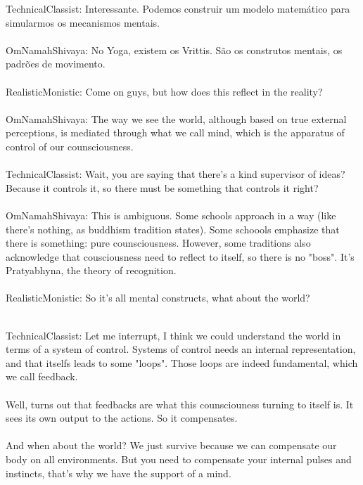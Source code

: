 \documentclass[11pt]{article}
\begin{document}
TechnicalClassist: Interessante. Podemos construir um modelo matemático para simularmos os mecanismos mentais.\\\\

OmNamahShivaya: No Yoga, existem os Vrittis. São os construtos mentais, os padrões de movimento.\\\\

RealisticMonistic: Come on guys, but how does this reflect in the reality? \\\\ 

OmNamahShivaya: The way we see the world, although based on true external perceptions, is mediated through what we call mind, which is the apparatus of control of our counsciousness.\\\\

TechnicalClassist: Wait, you are saying that there's a kind supervisor of ideas? Because it controls it, so there must be something that controls it right?\\\\

OmNamahShivaya: This is ambiguous. Some schools approach in a way (like there's nothing, as buddhism tradition states). Some schoools emphasize that there is something: pure counsciousness. However, some traditions also acknowledge that cousciousness need to reflect to itself, so there is no "boss". It's Pratyabhyna, the theory of recognition. \\\\

RealisticMonistic: So it's all mental constructs, what about the world?\\\

TechnicalClassist: Let me interrupt, I think we could understand the world in terms of a system of control. Systems of control needs an internal representation, and that itselfs leads to some "loops". Those loops are indeed fundamental, which we call feedback.\\\\ 

Well, turns out that feedbacks are what this counsciouness turning to itself is. It sees its own output to the actions. So it compensates.\\\\

And when about the world? We just survive because we can compensate our body on all environments. But you need to compensate your internal pulses and instincts, that's why we have the support of a mind.\\\\
\end{document}

